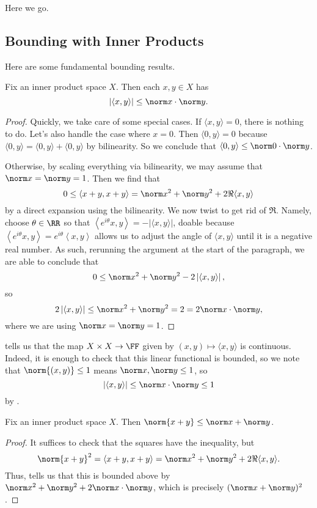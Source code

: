 \documentclass[../notes.tex]{subfiles}
\begin{document}
Here we go.

\subsection{Bounding with Inner Products}
Here are some fundamental bounding results.
\begin{proposition} \label{prop:cs-ineq}
	Fix an inner product space $X$. Then each $x,y\in X$ has
	\[\left|\langle x,y\rangle\right|\le\norm x\cdot\norm y.\]
\end{proposition}
\begin{proof}
	Quickly, we take care of some special cases. If $\langle x,y\rangle=0$, there is nothing to do. Let's also handle the case where $x=0$. Then $\langle0,y\rangle=0$ because $\langle0,y\rangle=\langle0,y\rangle+\langle0,y\rangle$ by bilinearity. So we conclude that $\langle0,y\rangle\le\norm0\cdot\norm y$.

	Otherwise, by scaling everything via bilinearity, we may assume that $\norm x=\norm y=1$. Then we find that
	\[0\le\langle x+y,x+y\rangle=\norm x^2+\norm y^2+2\Re\langle x,y\rangle\]
	by a direct expansion using the bilinearity. We now twist to get rid of $\Re$. Namely, choose $\theta\in\RR$ so that $\left\langle e^{i\theta}x,y\right\rangle=-\left|\langle x,y\rangle\right|$, doable because $\left\langle e^{i\theta}x,y\right\rangle=e^{i\theta}\left\langle x,y\right\rangle$ allows us to adjust the angle of $\langle x,y\rangle$ until it is a negative real number. As such, rerunning the argument at the start of the paragraph, we are able to conclude that
	\[0\le\norm x^2+\norm y^2-2\left|\langle x,y\rangle\right|,\]
	so
	\[2\left|\langle x,y\rangle\right|\le\norm x^2+\norm y^2=2=2\norm x\cdot\norm y,\]
	where we are using $\norm x=\norm y=1$.
\end{proof}
\begin{remark} \label{rem:inner-prod-cont}
	 tells us that the map $X\times X\to\FF$ given by $(x,y)\mapsto\langle x,y\rangle$ is continuous. Indeed, it is enough to check that this linear functional is bounded, so we note that $\norm{(x,y)}\le1$ means $\norm x,\norm y\le1$, so
	\[\left|\langle x,y\rangle\right|\le\norm x\cdot\norm y\le1\]
	by .
\end{remark}
\begin{proposition} \label{prop:tri-ineq}
	Fix an inner product space $X$. Then $\norm{x+y}\le\norm x+\norm y$.
\end{proposition}
\begin{proof}
	It suffices to check that the squares have the inequality, but
	\[\norm{x+y}^2=\langle x+y,x+y\rangle=\norm x^2+\norm y^2+2\Re\langle x,y\rangle.\]
	Thus,  tells us that this is bounded above by $\norm x^2+\norm y^2+2\norm x\cdot\norm y$, which is precisely $(\norm x+\norm y)^2$.
\end{proof}
\end{document}
